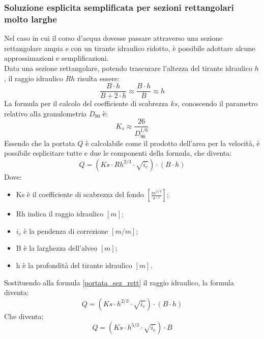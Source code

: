 \subsubsection{Soluzione esplicita semplificata per sezioni rettangolari molto larghe}
Nel caso in cui il corso d'acqua dovesse passare attraverso una sezione rettangolare ampia e con un tirante idraulico ridotto, è possibile adottare alcune approssimazioni e semplificazioni.\\
Data una sezione rettangolare, potendo trascurare l'altezza del tirante idraulico $h$, il raggio idraulico $Rh$ risulta essere:
\begin{equation}
    \frac{B \cdot h}{B + 2\cdot h} \approx \frac{B \cdot h}{B} \approx h
\end{equation}
La formula per il calcolo del coefficiente di scabrezza $ks$, conoscendo il parametro relativo alla granulometria $D_{90}$ è:
\begin{equation}
K_s \approx \frac{26}{D_{90}^{1/6}}
\end{equation}
Essendo che la portata $Q$ è calcolabile come il prodotto dell'area per la velocità, è possibile esplicitare tutte e due le componenti della formula, che diventa:
\begin{equation}
    Q = (Ks \cdot Rh^{2/3} \cdot \sqrt{i_c}) \cdot (B \cdot h)
    \label{portata_sez_rett}
\end{equation}
Dove:
\begin{itemize}
    \item Ks è il coefficiente di scabrezza del fondo $\left[\frac{m^{1/3}}{s^{-1}}\right]$;
    \item Rh indica il raggio idraulico $[m]$;
    \item $i_c$ è la pendenza di correzione $\left[m/m\right]$;
    \item B è la larghezza dell'alveo $[m]$;
    \item h è la profondità del tirante idraulico $[m]$.
\end{itemize}
Sostituendo alla formula \ref{portata_sez_rett} il raggio idraulico, la formula diventa:
\begin{equation}
    Q = (Ks \cdot h^{2/3} \cdot \sqrt{i_c}) \cdot (B \cdot h)
\end{equation}
Che diventa:
\begin{equation}
    Q = (Ks \cdot h^{5/3} \cdot \sqrt{i_c}) \cdot B
\end{equation}

